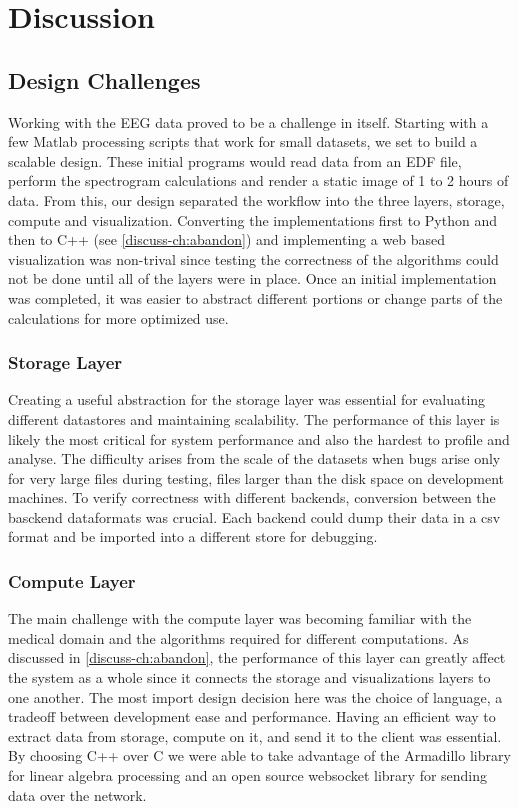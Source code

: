 \chapter{Discussion}\label{discuss-ch}

\section{Design Challenges}

Working with the EEG data proved to be a challenge in itself. Starting with a
few Matlab processing scripts that work for small datasets, we set to build a
scalable design. These initial programs would read data from an EDF file,
perform the spectrogram calculations and render a static image of 1 to 2 hours
of data. From this, our design separated the workflow into the three layers,
storage, compute and visualization. Converting the implementations first to
Python and then to C++ (see \ref{discuss-ch:abandon}) and implementing a web based
visualization was non-trival since testing the correctness of the algorithms
could not be done until all of the layers were in place. Once an initial
implementation was completed, it was easier to abstract different portions or
change parts of the calculations for more optimized use. \\

\subsection{Storage Layer}

Creating a useful abstraction for the storage layer was essential for
evaluating different datastores and maintaining scalability. The performance of
this layer is likely the most critical for system performance and also the
hardest to profile and analyse. The difficulty arises from the scale of the
datasets when bugs arise only for very large files during testing, files larger
than the disk space on development machines. To verify correctness with
different backends, conversion between the basckend dataformats was crucial.
Each backend could dump their data in a csv format and be imported into a
different store for debugging.

\subsection{Compute Layer}

The main challenge with the compute layer was becoming familiar with the
medical domain and the algorithms required for different computations. As
discussed in \ref{discuss-ch:abandon}, the performance of this layer can greatly
affect the system as a whole since it connects the storage and visualizations
layers to one another. The most import design decision here was the choice of
language, a tradeoff between development ease and performance. Having an
efficient way to extract data from storage, compute on it, and send it to the
client was essential. By choosing C++ over C we were able to take advantage of
the Armadillo \cite{arma} library for linear algebra processing and an open source
websocket library \cite{websocket-server} for sending data over the network.

